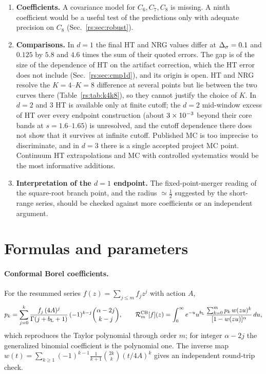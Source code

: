 \begin{enumerate}
tests.
\item \textbf{Coefficients.} A covariance model for $C_6,C_7,C_8$ is missing. A ninth
coefficient would be a useful test of the predictions only with adequate precision on $C_8$
(Sec.~\ref{rs:sec:robust}).
\item \textbf{Comparisons.} In $d=1$ the final HT and NRG values differ at $\Delta_\sigma=0.1$ and
$0.125$ by $5.8$ and $4.6$ times the sum of their quoted errors. The gap is of the size of the
dependence of HT on the artifact correction, which the HT error does not include
(Sec.~\ref{rs:sec:cmp1d}), and its origin is open. HT and NRG resolve the $K=4$--$K=8$ difference at
several points but lie between the two curves there (Table~\ref{rs:tab:k4k8}), so they cannot
justify the choice of $K$. In $d=2$ and $3$ HT is available only at finite cutoff; the $d=2$
mid-window excess of HT over every endpoint construction (about $3\times10^{-3}$ beyond their
core bands at $s=1.6$--$1.65$) is unresolved, and the cutoff dependence there does not show
that it survives at infinite cutoff. Published MC is too imprecise to discriminate, and in
$d=3$ there is a single accepted project MC point. Continuum HT extrapolations and MC with
controlled systematics would be the most informative additions.
\item \textbf{Interpretation of the $d=1$ endpoint.} The fixed-point-merger reading of the
square-root branch point, and the radius $\simeq\frac12$ suggested by the short-range series,
should be checked against more coefficients or an independent argument.
\end{enumerate}

\appendix
\section{Formulas and parameters}\label{rs:app:formulas}
\paragraph{Conformal Borel coefficients.} For the resummed series $f(z)=\sum_{j\le m}f_jz^j$
with action $A$,
\begin{equation}
 p_k=\sum_{j=0}^k\frac{f_j\,(4A)^j}{\Gamma(j+b_{\mathrm L}+1)}\,(-1)^{k-j}\binom{\alpha-2j}{k-j},\qquad
 \mathcal R_m^{\rm CB}[f](z)=\int_0^\infty e^{-u}u^{b_{\mathrm L}}\,
 \frac{\sum_{k=0}^mp_k\,w(zu)^k}{[1-w(zu)]^\alpha}\,d u ,
 \label{rs:eq:pk}
\end{equation}
which reproduces the Taylor polynomial through order $m$; for integer $\alpha-2j$ the
generalized binomial coefficient is the polynomial one. The inverse map
$w(t)=\sum_{k\ge1}(-1)^{k-1}\frac{1}{k+1}\binom{2k}{k}(t/4A)^k$ gives an independent
round-trip check.


